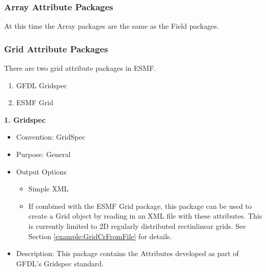 \vspace{.20in}
\subsubsection{Array Attribute Packages}
\label{ArrayAttributePackages}

At this time the Array packages are the same as the Field packages.


\vspace{.20in}
\subsubsection{Grid Attribute Packages}
\label{GridAttributePackages}

There are two grid attribute packages in ESMF. 

\begin{enumerate}
    \item GFDL Gridspec
    \item ESMF Grid
\end{enumerate}



\vspace{.20in}
{\bf 1. Gridspec}

\label{CIMGridAttributePackage}

\begin{itemize}
    \item Convention: GridSpec
    \item Purpose: General
    \item Output Options
    \begin{itemize}
        \item Simple XML
        \item If combined with the ESMF Grid package, this package can be used to create a Grid object by reading in an XML file with these attributes. This is currently limited to 2D regularly distributed rectinlinear grids. See Section \ref{example:GridCrFromFile} for details. 
    \end{itemize}
    \item Description: This package contains the Attributes developed as part of GFDL's Gridspec standard.
\end{itemize}

